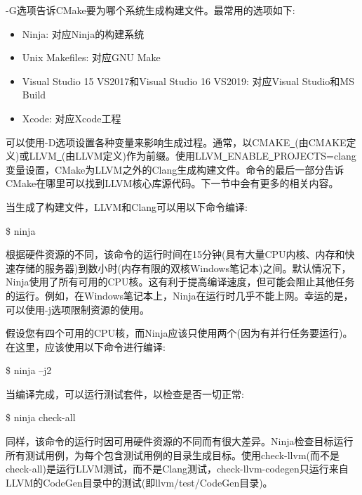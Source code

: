 -G选项告诉CMake要为哪个系统生成构建文件。最常用的选项如下:\par

\begin{itemize}
\item Ninja: 对应Ninja的构建系统
\item Unix Makefiles: 对应GNU Make
\item Visual Studio 15 VS2017和Visual Studio 16 VS2019: 对应Visual Studio和MS Build
\item Xcode: 对应Xcode工程
\end{itemize}

可以使用-D选项设置各种变量来影响生成过程。通常，以CMAKE\underline{~}(由CMAKE定义)或LLVM\underline{~}(由LLVM定义)作为前缀。使用LLVM\underline{~}ENABLE\underline{~}PROJECTS=clang变量设置，CMake为LLVM之外的Clang生成构建文件。命令的最后一部分告诉CMake在哪里可以找到LLVM核心库源代码。下一节中会有更多的相关内容。\par

当生成了构建文件，LLVM和Clang可以用以下命令编译:\par

\begin{tcolorbox}[colback=white,colframe=black]
\$ ninja
\end{tcolorbox}

根据硬件资源的不同，该命令的运行时间在15分钟(具有大量CPU内核、内存和快速存储的服务器)到数小时(内存有限的双核Windows笔记本)之间。默认情况下，Ninja使用了所有可用的CPU核。这有利于提高编译速度，但可能会阻止其他任务的运行。例如，在Windows笔记本上，Ninja在运行时几乎不能上网。幸运的是，可以使用-j选项限制资源的使用。\par

假设您有四个可用的CPU核，而Ninja应该只使用两个(因为有并行任务要运行)。在这里，应该使用以下命令进行编译:\par

\begin{tcolorbox}[colback=white,colframe=black]
\$ ninja –j2
\end{tcolorbox}

当编译完成，可以运行测试套件，以检查是否一切正常:\par

\begin{tcolorbox}[colback=white,colframe=black]
\$ ninja check-all
\end{tcolorbox}

同样，该命令的运行时因可用硬件资源的不同而有很大差异。Ninja检查目标运行所有测试用例，为每个包含测试用例的目录生成目标。使用check-llvm(而不是check-all)是运行LLVM测试，而不是Clang测试，check-llvm-codegen只运行来自LLVM的CodeGen目录中的测试(即llvm/test/CodeGen目录)。\par

